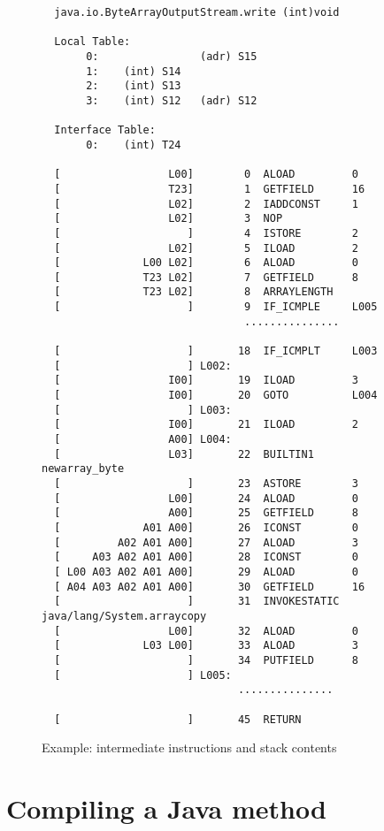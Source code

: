 \begin{figure*}[htb]
\begin{center}
\begin{verbatim}
  java.io.ByteArrayOutputStream.write (int)void

  Local Table:
       0:                (adr) S15
       1:    (int) S14
       2:    (int) S13
       3:    (int) S12   (adr) S12

  Interface Table:
       0:    (int) T24

  [                 L00]        0  ALOAD         0
  [                 T23]        1  GETFIELD      16
  [                 L02]        2  IADDCONST     1
  [                 L02]        3  NOP         
  [                    ]        4  ISTORE        2
  [                 L02]        5  ILOAD         2
  [             L00 L02]        6  ALOAD         0
  [             T23 L02]        7  GETFIELD      8
  [             T23 L02]        8  ARRAYLENGTH  
  [                    ]        9  IF_ICMPLE     L005
                                ...............

  [                    ]       18  IF_ICMPLT     L003
  [                    ] L002:
  [                 I00]       19  ILOAD         3
  [                 I00]       20  GOTO          L004
  [                    ] L003:
  [                 I00]       21  ILOAD         2
  [                 A00] L004:
  [                 L03]       22  BUILTIN1      newarray_byte
  [                    ]       23  ASTORE        3
  [                 L00]       24  ALOAD         0
  [                 A00]       25  GETFIELD      8
  [             A01 A00]       26  ICONST        0
  [         A02 A01 A00]       27  ALOAD         3
  [     A03 A02 A01 A00]       28  ICONST        0
  [ L00 A03 A02 A01 A00]       29  ALOAD         0
  [ A04 A03 A02 A01 A00]       30  GETFIELD      16
  [                    ]       31  INVOKESTATIC  java/lang/System.arraycopy
  [                 L00]       32  ALOAD         0
  [             L03 L00]       33  ALOAD         3
  [                    ]       34  PUTFIELD      8
  [                    ] L005:
                               ...............

  [                    ]       45  RETURN       
\end{verbatim}
\caption{Example: intermediate instructions and stack contents}
\label{IntermediateStack}
\end{center}
\end{figure*}


\section{Compiling a Java method}

